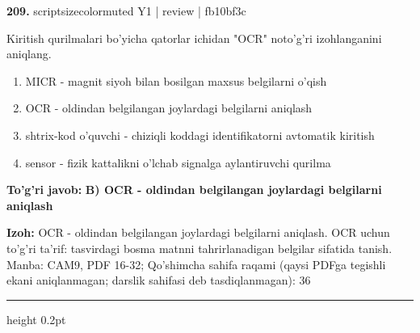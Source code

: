 \documentclass[10pt,a4paper]{article}
\begin{document}
{\bfseries\sffamily\color{ink} 209.} {scriptsizecolor{muted} Y1 | review | fb10bf3c}
\par
Kiritish qurilmalari bo'yicha qatorlar ichidan "OCR" noto'g'ri izohlanganini aniqlang.
\begin{enumerate}[label=\Alph*),leftmargin=9mm]
\item MICR - magnit siyoh bilan bosilgan maxsus belgilarni o'qish
\item OCR - oldindan belgilangan joylardagi belgilarni aniqlash
\item shtrix-kod o'quvchi - chiziqli koddagi identifikatorni avtomatik kiritish
\item sensor - fizik kattalikni o'lchab signalga aylantiruvchi qurilma
\end{enumerate}
\begin{tcolorbox}[enhanced,breakable,colback=teal!4,colframe=teal!60!black,boxrule=0.45pt,arc=1.2mm,left=2.7mm,right=2.7mm,top=1.8mm,bottom=1.8mm,before skip=2mm,after skip=2mm]
{\bfseries\sffamily\color{teal}To'g'ri javob:} \textbf{B) OCR - oldindan belgilangan joylardagi belgilarni aniqlash}
\par\smallskip
{\bfseries Izoh:} OCR - oldindan belgilangan joylardagi belgilarni aniqlash. OCR uchun to'g'ri ta'rif: tasvirdagi bosma matnni tahrirlanadigan belgilar sifatida tanish. Manba: CAM9, PDF 16-32; Qo'shimcha sahifa raqami (qaysi PDFga tegishli ekani aniqlanmagan; darslik sahifasi deb tasdiqlanmagan): 36
\end{tcolorbox}
\vspace{2mm}\hrule height 0.2pt\vspace{3mm}
\end{document}
